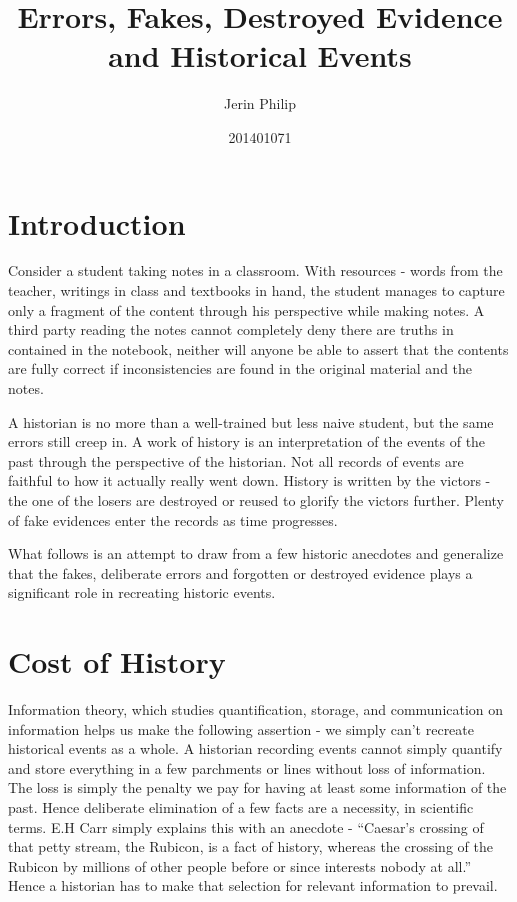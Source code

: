 \documentclass[a4paper]{article}
\title{Errors, Fakes, Destroyed Evidence and Historical Events}
\author{Jerin Philip}
\date{201401071}
\begin{document}
\maketitle

\section{Introduction}
Consider a student taking notes in a classroom. With resources - words
from the teacher, writings in class and textbooks in hand, the student
manages to capture only a fragment of the content through his
perspective while making notes. A third party reading the notes cannot
completely deny there are truths in contained in the notebook, neither
will anyone be able to assert that the contents are fully correct if
inconsistencies are found in the original material and the notes.

A historian is no more than a well-trained but less naive student, but
the same errors still creep in. A work of history is an interpretation
of the events of the past through the perspective of the historian.  Not
all records of events are faithful to how it actually really went down.
History is written by the victors - the one of the losers are destroyed
or reused to glorify the victors further. Plenty of fake
evidences enter the records as time progresses.

What follows is an attempt to draw from a few historic anecdotes and
generalize that the fakes, deliberate errors and forgotten or destroyed
evidence plays a significant role in recreating historic events.

\section{Cost of History}

Information theory, which studies quantification, storage, and
communication on information helps us make the following assertion - we
simply can't recreate historical events as a whole. A historian
recording events cannot simply quantify and store everything in a few
parchments or lines without loss of information. The loss is simply the
penalty we pay for having at least some information of the past. Hence
deliberate elimination of a few facts are a necessity, in scientific
terms. E.H Carr simply explains this \cite[p.9]{carr1961history} with an
anecdote - ``Caesar's crossing of that petty stream, the Rubicon, is a
fact of history, whereas the crossing of the Rubicon by millions of
other people before or since interests nobody at all.'' Hence a
historian has to make that selection for relevant information to
prevail.
\end{document}
